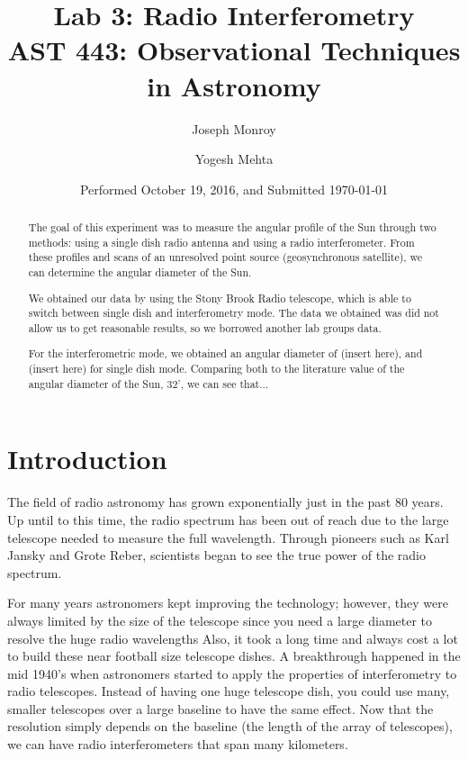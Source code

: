 \documentclass{aastex61}
\begin{document}
\title{Lab 3: Radio Interferometry \\ AST 443: Observational Techniques in Astronomy}

\date{Performed October 19, 2016, and Submitted \today}

\author{Joseph Monroy}

\author{Yogesh Mehta}


\begin{abstract}
The goal of this experiment was to measure the angular profile of the Sun through two methods: using a single dish radio antenna and using a radio interferometer. From these profiles and scans of an unresolved point source (geosynchronous satellite), we can determine the angular diameter of the Sun.

We obtained our data by using the Stony Brook Radio telescope, which is able to switch between single dish and interferometry mode. The data we obtained was did not allow us to get reasonable results, so we borrowed another lab groups data.

For the interferometric mode, we obtained an angular diameter of (insert here), and (insert here) for single dish mode. Comparing both to the literature value of the angular diameter of the Sun, 32', we can see that...
\end{abstract}

\section{Introduction} \label{sec:intro}
The field of radio astronomy has grown exponentially just in the past 80 years. Up until to this time, the radio spectrum has been out of reach due to the large telescope needed to measure the full wavelength. Through pioneers such as Karl Jansky and Grote Reber, scientists began to see the true power of the radio spectrum. 

For many years astronomers kept improving the technology; however, they were always limited by the size of the telescope since you need a large diameter to resolve the huge radio wavelengths Also, it took a long time and always cost a lot to build these near football size telescope dishes. A breakthrough happened in the mid 1940's when astronomers started to apply the properties of interferometry to radio telescopes. Instead of having one huge telescope dish, you could use many, smaller telescopes over a large baseline to have the same effect. Now that the resolution simply depends on the baseline (the length of the array of telescopes), we can have radio interferometers that span many kilometers.
\end{document}
